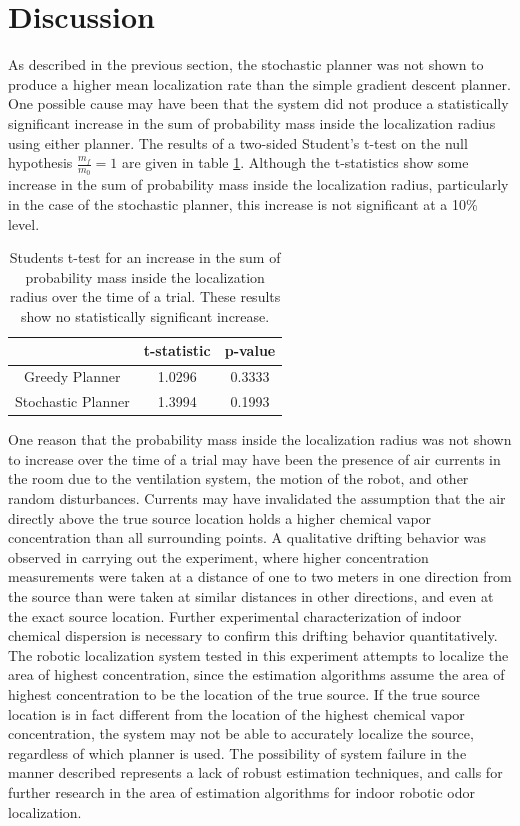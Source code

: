 \documentclass[submit]{aiaa-pretty-modified}
\begin{document}
\section{Discussion}
As described in the previous section, the stochastic planner was not
shown to produce a higher mean localization
rate than the simple gradient descent planner.  One possible cause may
have been
that the system did not produce a statistically significant increase
in the sum of probability mass inside the localization radius using
either planner.  The results of a two-sided Student's t-test on the
null hypothesis $\frac{m_f}{m_0} = 1$ are given in table
\ref{tab:nofind}.  Although the t-statistics show some increase in the
sum of probability mass inside the localization radius,
particularly in the case of the stochastic planner, this increase is
not significant at a 10\% level.

\begin{table}[htb]
\begin{center}
\begin{tabular}{|c||c|c|}
\hline
& t-statistic & p-value \\
\hline \hline
Greedy Planner & 1.0296 & 0.3333\\
\hline
Stochastic Planner& 1.3994 &0.1993\\
\hline
\end{tabular}
\caption{Students t-test for an increase in the sum of probability
  mass inside the localization radius over the time of a trial.
  These results show no statistically significant increase. \label{tab:nofind} }
\end{center}
\end{table}


One reason that the probability mass inside the localization
radius was not shown to increase over the time of a trial may have been
the presence of air currents in the room due to the ventilation
system, the motion of the robot, and other random disturbances. Currents may have invalidated the
assumption that the air directly above the true source location
holds a higher chemical vapor concentration than all surrounding
points.  A qualitative drifting behavior was observed in carrying out
the experiment, where higher concentration measurements were taken
at a distance of one to two meters in one direction from the source than were
taken at similar distances in other directions, and even at the exact
source location.  Further experimental characterization of indoor
chemical dispersion is necessary to confirm this drifting
behavior quantitatively.  The robotic localization system tested in
this experiment attempts to localize the area of highest
concentration, since the estimation algorithms assume the area of highest
concentration to be the location of the true source.  If the true
source location is in fact different from the location of the
highest chemical vapor concentration, the system may not be able to accurately
localize the source, regardless of which planner is used.  The
possibility of system failure in the manner described represents a lack of robust estimation techniques, and
calls for further research in the area of estimation algorithms for
indoor robotic odor localization.
\end{document}
